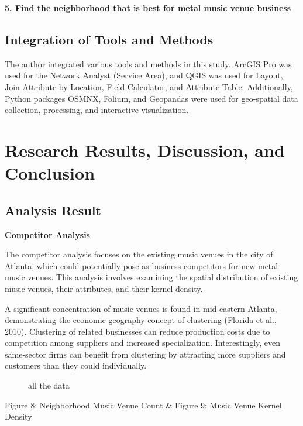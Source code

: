 \documentclass[11pt]{article}
\begin{document}
\textbf{5. Find the neighborhood that is best for metal music venue business}


\subsection{Integration of Tools and Methods} The author integrated various tools and methods in this study. ArcGIS Pro was used for the Network Analyst (Service Area), and QGIS was used for Layout, Join Attribute by Location, Field Calculator, and Attribute Table. Additionally, Python packages OSMNX, Folium, and Geopandas were used for geo-spatial data collection, processing, and interactive visualization. 

\section{Research Results, Discussion, and Conclusion}
\subsection{Analysis Result}

\textbf{Competitor Analysis}

The competitor analysis focuses on the existing music venues in the city of Atlanta, which could potentially pose as business competitors for new metal music venues. This analysis involves examining the spatial distribution of existing music venues, their attributes, and their kernel density.

A significant concentration of music venues is found in mid-eastern Atlanta, demonstrating the economic geography concept of clustering (Florida et al., 2010). Clustering of related businesses can reduce production costs due to competition among suppliers and increased specialization. Interestingly, even same-sector firms can benefit from clustering by attracting more suppliers and customers than they could individually.

\begin{figure}[H] 
    \centering
    \hfill%
    \caption{all the data}
\end{figure}


\begin{center}
\centering
Figure 8: Neighborhood Music Venue Count \& Figure 9: Music Venue Kernel Density
\end{center}
\end{document}
